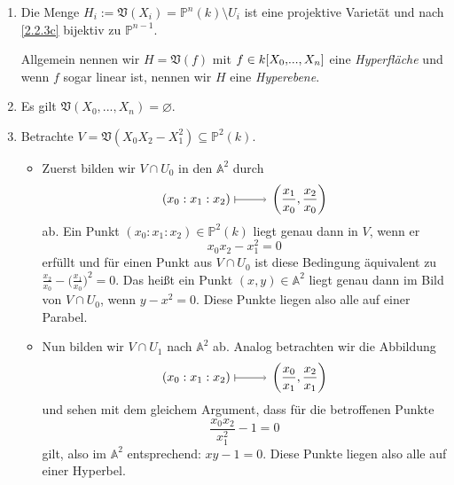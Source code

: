 \documentclass[a4paper,12pt]{scrbook}
\def\A{\mathbb{A}}
\def\V{\mathfrak{V}}
\def\P{\mathbb{P}}
\newcommand{\leer}{\ensuremath{\varnothing}}
\renewcommand{\dotsc}{\ensuremath{\!...}}
\renewcommand{\mapsto}{\raisebox{-1pt}{\tikz{\draw[thin,shorten >=3pt, |->] (0,0) node{\hspace*{0pt}} -- node{} (1,0);}}\penalty1000\relax}
\newcommand{\ppolyx}[1][n]{\ensuremath%
  [X_{0},\dotsc,X_{#1}]}
\begin{document}
\begin{bsp}\label{2.3.3}\begin{enumerate}
\item Die Menge $H_{i}:=\V(X_{i})=\P^{n}(k)\setminus U_{i}$ ist eine projektive Varietät und nach \cref{2.2.3c} bijektiv zu $\P^{n-1}$.

Allgemein nennen wir $H=\V(f)$ mit $f\in k\ppolyx$ eine \emph{Hyperfläche} und wenn $f$ sogar linear ist, nennen wir $H$ eine \emph{Hyperebene}.
\item Es gilt $\V(X_{0},\dotsc,X_{n})=\leer$.
\item Betrachte $V=\V(X_{0}X_{2}-X_{1}^{2})\subseteq\P^{2}(k)$.
\begin{itemize}
\item Zuerst bilden wir $V\cap U_{0}$ in den $\A^{2}$ durch
\[(x_{0}:x_{1}:x_{2})\mapsto\left(\frac{x_{1}}{x_{0}},\frac{x_{2}}{x_{0}}\right)\]
ab. Ein Punkt $(x_{0}:x_{1}:x_{2})\in\P^{2}(k)$ liegt genau dann in $V$, wenn er \[x_{0}x_{2}-x_{1}^{2}=0\] erfüllt und für einen Punkt aus $V\cap U_{0}$ ist diese Bedingung äquivalent zu $\frac{x_{2}}{x_{0}}-\bigl(\frac{x_{1}}{x_{0}}\bigr)^{2}=0$. Das heißt ein Punkt $(x,y)\in\A^{2}$ liegt genau dann im Bild von $V\cap U_{0}$, wenn $y-x^{2}=0$. Diese Punkte liegen also alle auf einer Parabel.
\item Nun bilden wir $V\cap U_{1}$ nach $\A^{2}$ ab. Analog betrachten wir die Abbildung
\[(x_{0}:x_{1}:x_{2})\mapsto\left(\frac{x_{0}}{x_{1}},\frac{x_{2}}{x_{1}}\right)\]
und sehen mit dem gleichem Argument, dass für die betroffenen Punkte \[\frac{x_{0}x_{2}}{x_{1}^{2}}-1=0\] gilt, also im $\A^{2}$ entsprechend: $xy-1=0$. Diese Punkte liegen also alle auf einer Hyperbel.
\end{itemize}\end{enumerate}\end{bsp}
\end{document}

